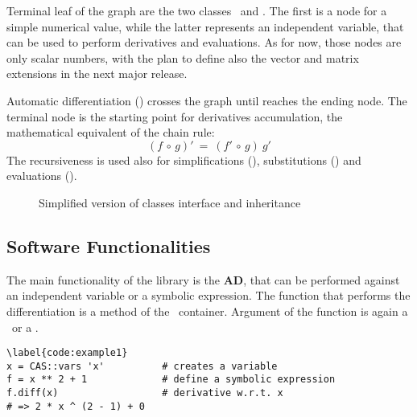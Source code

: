 Terminal leaf of the graph are the two classes \CASConstant~and \CASVariable. The first is a node for a simple numerical value, while the latter represents an independent variable, that can be used to perform derivatives and evaluations. As for now, those nodes are only scalar numbers, with the plan to define also the vector and matrix extensions in the next major release.

Automatic differentiation (\CASOpdiff) crosses the graph until reaches the ending node. The terminal node is the starting point for derivatives accumulation, the mathematical equivalent of the chain rule:
\begin{equation}
\left( f  \, \circ \, g \right)' \: = \:
\left( f' \, \circ \, g \right) \: g'
\end{equation}
The recursiveness is used also for simplifications (\CASOpsimplify), substitutions (\CASOpsubs) and evaluations (\CASOpcall).

\begin{figure}[ht!]
\label{fig:uml-container}
\centering

\caption{Simplified version of classes interface and inheritance}
\end{figure}

\subsection{Software Functionalities}
\label{sec:functionalities}


The main functionality of the library is the \textbf{AD}, that can be performed against an independent variable or a symbolic expression. The function that performs the differentiation is a method of the \CASOp~container. Argument of the function is again a \CASOp~or a \CASVariable.
\begin{lstlisting}
\label{code:example1}
x = CAS::vars 'x'          # creates a variable
f = x ** 2 + 1             # define a symbolic expression
f.diff(x)                  # derivative w.r.t. x
# => 2 * x ^ (2 - 1) + 0
\end{lstlisting}

